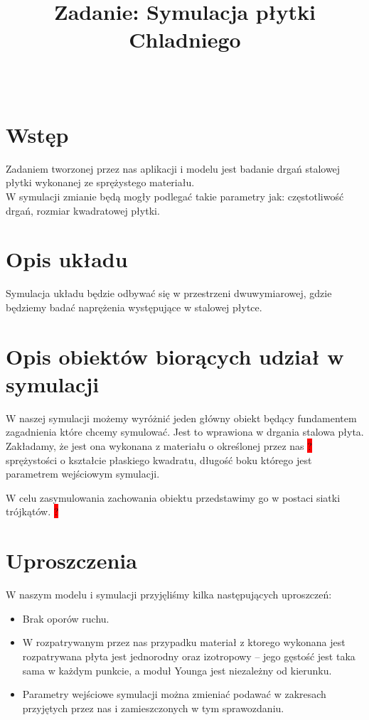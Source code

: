 \documentclass{classrep}
\author{%
  \studentinfo[210347@edu.p.lodz.pl]{Krzysztof Wierzbicki}{210347}\\
  \studentinfo[210209@edu.p.lodz.pl]{Bartosz Jurczewski}{210209}%
}
\title{Zadanie: Symulacja płytki Chladniego }
\begin{document}
\maketitle
\thispagestyle{fancyplain}

\newpage

\section{Wstęp}
Zadaniem tworzonej przez nas aplikacji i modelu jest badanie drgań stalowej płytki wykonanej ze sprężystego materiału. \\
W symulacji zmianie będą mogły podlegać takie parametry jak: częstotliwość drgań, rozmiar kwadratowej płytki.

\section{Opis układu}
Symulacja układu będzie odbywać się w przestrzeni dwuwymiarowej, gdzie będziemy badać naprężenia występujące w stalowej płytce. 

\section{Opis obiektów biorących udział w symulacji}
W naszej symulacji możemy wyróżnić jeden główny obiekt będący fundamentem zagadnienia które chcemy symulować. Jest to wprawiona w drgania stalowa płyta. Zakładamy, że jest ona wykonana z materiału o określonej przez nas \colorbox{red}{?} sprężystości o kształcie płaskiego kwadratu, długość boku którego jest parametrem wejściowym symulacji.

W celu zasymulowania zachowania obiektu przedstawimy go w postaci siatki trójkątów. \colorbox{red}{?}

\section{Uproszczenia}
W naszym modelu i symulacji przyjęliśmy kilka następujących uproszczeń:
\begin{itemize}
	\item Brak oporów ruchu.
	\item W rozpatrywanym przez nas przypadku materiał z ktorego wykonana jest rozpatrywana płyta jest jednorodny oraz izotropowy -- jego gęstość jest taka sama w każdym punkcie, a moduł Younga jest niezależny od kierunku.
	\item Parametry wejściowe symulacji można zmieniać podawać w zakresach przyjętych przez nas i zamieszczonych w tym sprawozdaniu.
\end{itemize}
\end{document}
